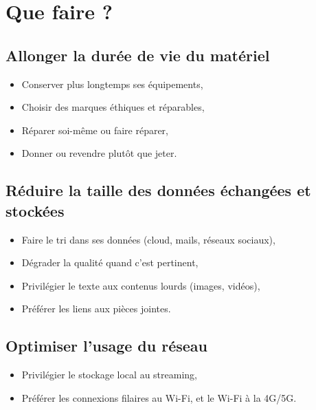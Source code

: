 \documentclass[11pt, a4paper]{book}
\begin{document}
\section{Que faire ?}
\subsection{Allonger la durée de vie du matériel}
\begin{itemize}
  \item Conserver plus longtemps ses équipements,
  \item Choisir des marques éthiques et réparables,
  \item Réparer soi-même ou faire réparer,
  \item Donner ou revendre plutôt que jeter.
\end{itemize}

\subsection{Réduire la taille des données échangées et stockées}
\begin{itemize}
  \item Faire le tri dans ses données (cloud, mails, réseaux sociaux),
  \item Dégrader la qualité quand c’est pertinent,
  \item Privilégier le texte aux contenus lourds (images, vidéos),
  \item Préférer les liens aux pièces jointes.
\end{itemize}

\subsection{Optimiser l’usage du réseau}
\begin{itemize}
  \item Privilégier le stockage local au streaming,
  \item Préférer les connexions filaires au Wi-Fi, et le Wi-Fi à la 4G/5G.
\end{itemize}
\end{document}
